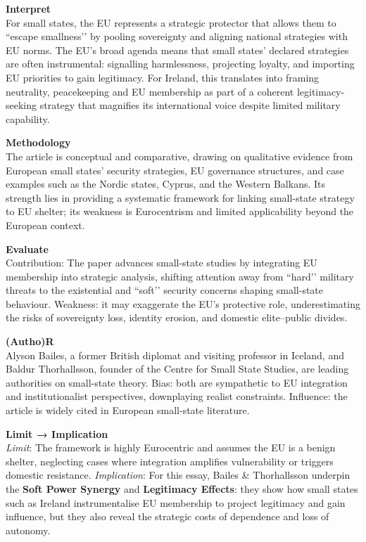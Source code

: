 \textbf{Interpret} \\
For small states, the EU represents a strategic protector that allows them to ``escape smallness’’ by pooling sovereignty and aligning national strategies with EU norms. The EU’s broad agenda means that small states’ declared strategies are often instrumental: signalling harmlessness, projecting loyalty, and importing EU priorities to gain legitimacy. For Ireland, this translates into framing neutrality, peacekeeping and EU membership as part of a coherent legitimacy-seeking strategy that magnifies its international voice despite limited military capability.

\textbf{Methodology} \\
The article is conceptual and comparative, drawing on qualitative evidence from European small states’ security strategies, EU governance structures, and case examples such as the Nordic states, Cyprus, and the Western Balkans. Its strength lies in providing a systematic framework for linking small-state strategy to EU shelter; its weakness is Eurocentrism and limited applicability beyond the European context.

\textbf{Evaluate} \\
Contribution: The paper advances small-state studies by integrating EU membership into strategic analysis, shifting attention away from ``hard’’ military threats to the existential and ``soft’’ security concerns shaping small-state behaviour. Weakness: it may exaggerate the EU’s protective role, underestimating the risks of sovereignty loss, identity erosion, and domestic elite–public divides.  

\textbf{(Autho)R} \\
Alyson Bailes, a former British diplomat and visiting professor in Iceland, and Baldur Thorhallsson, founder of the Centre for Small State Studies, are leading authorities on small-state theory. Bias: both are sympathetic to EU integration and institutionalist perspectives, downplaying realist constraints. Influence: the article is widely cited in European small-state literature.  

\textbf{Limit → Implication} \\
\textit{Limit}: The framework is highly Eurocentric and assumes the EU is a benign shelter, neglecting cases where integration amplifies vulnerability or triggers domestic resistance.  
\textit{Implication}: For this essay, Bailes \& Thorhallsson underpin the \textbf{Soft Power Synergy} and \textbf{Legitimacy Effects}: they show how small states such as Ireland instrumentalise EU membership to project legitimacy and gain influence, but they also reveal the strategic costs of dependence and loss of autonomy.

